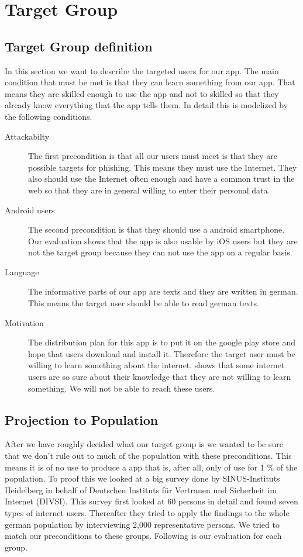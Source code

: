 \section{Target Group}
\label{s:target_group}

\subsection{Target Group definition}
In this section we want to describe the targeted users for our app.
The main condition that must be met is that they can learn something from our app.
That means they are skilled enough to use the app and not to skilled so that they already know everything that the app tells them.
In detail this is modelized by the following conditions.
\begin{description}
\item[Attackabilty] The first precondition is that all our users must meet is that they are possible targets for phishing.
This means they must use the Internet.
They also should use the Internet often enough and have a common trust in the web so that they are in general willing to enter their personal data.
\cite{divsi2012divsi}
\item[Android users] The second precondition is that they should use a android smartphone.
Our evaluation shows that the app is also usable by iOS users but they are not the target group because they can not use the app on a regular basis.
\item[Language] The informative parts of our app are texts and they are written in german.
This means the target user should be able to read german texts.
\item[Motivation] The distribution plan for this app is to put it on the google play store and hope that users download and install it.
Therefore the target user must be willing to learn something about the internet.
\cite{divsi2012divsi} shows that some internet users are so sure about their knowledge that they are not willing to learn something.
We will not be able to reach these users.
\end{description}

\subsection{Projection to Population}
After we have roughly decided what our target group is we wanted to be sure that we don't rule out to much of the population with these preconditions.
This means it is of no use to produce a app that is, after all, only of use for 1 \% of the population.
To proof this we looked at a big survey done by SINUS-Instituts Heidelberg in behalf of Deutschen Instituts für Vertrauen und Sicherheit im Internet (DIVSI).
This survey first looked at 60 persons in detail and found seven types of internet users.
Thereafter they tried to apply the findings to the whole german population by interviewing 2,000 representative persons.
We tried to match our preconditions to these groups. Following is our evaluation for each group\cite{divsi2012divsi}.

